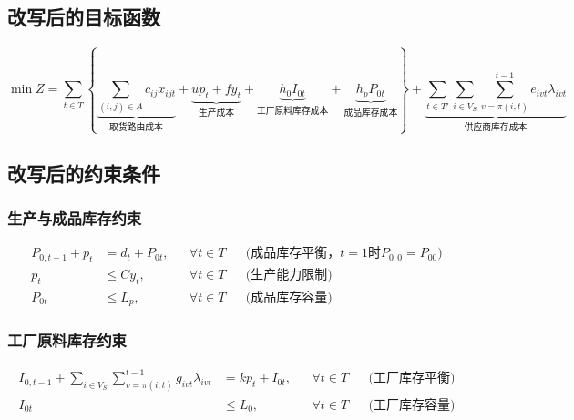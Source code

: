 \documentclass{article}
\begin{document}
\subsection{改写后的目标函数}
\begin{equation}
\min Z = \sum_{t \in T} \left\{
\underbrace{\sum_{(i,j) \in A} c_{ij} x_{ijt}}_{\text{取货路由成本}}
+ \underbrace{u p_t + f y_t}_{\text{生产成本}}
+ \underbrace{h_0 I_{0t}}_{\text{工厂原料库存成本}}
+ \underbrace{h_p P_{0t}}_{\text{成品库存成本}}
\right\}
+ \underbrace{\sum_{t \in T'} \sum_{i \in V_S} \sum_{v=\pi(i,t)}^{t-1} e_{ivt}\lambda_{ivt}}_{\text{供应商库存成本}}
\end{equation}

\subsection{改写后的约束条件}

\subsubsection{生产与成品库存约束}
\vspace{-1.5ex}
\begin{align}
P_{0,t-1} + p_t &= d_t + P_{0t}, && \forall t \in T && \text{(成品库存平衡，$t=1$时$P_{0,0}=P_{00}$)} \\
p_t &\leq C y_t, && \forall t \in T && \text{(生产能力限制)} \\
P_{0t} &\leq L_p, && \forall t \in T && \text{(成品库存容量)}
\end{align}

\subsubsection{工厂原料库存约束}
\vspace{-1.5ex}
\begin{align}
I_{0,t-1} + \sum_{i \in V_S} \sum_{v=\pi(i,t)}^{t-1} g_{ivt}\lambda_{ivt} &= k p_t + I_{0t}, && \forall t \in T && \text{(工厂库存平衡)} \\
I_{0t} &\leq L_0, && \forall t \in T && \text{(工厂库存容量)}
\end{align}
\end{document}
